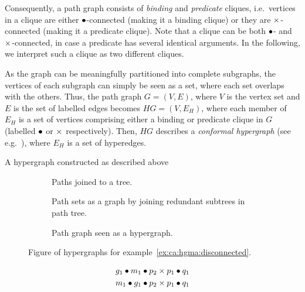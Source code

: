 \documentclass[../Master.tex]{subfiles}
\begin{document}
Consequently, a path graph consists of \textit{binding} and \textit{predicate} cliques, i.e.\ vertices in a clique are either $\bullet$-connected (making it a binding clique) or they are $\times$-connected (making it a predicate clique). Note that a clique can be both $\bullet$- and $\times$-connected, in case a predicate has several identical arguments. In the following, we interpret such a clique as two different cliques.

As the graph can be meaningfully partitioned into complete subgraphs, the vertices of each subgraph can simply be seen as a set, where each set overlaps with the others. Thus, the path graph $G = (V, E)$, where $V$ is the vertex set and $E$ is the set of labelled edges becomes $HG = \left(V, E_H\right)$, where each member of $E_H$ is a set of vertices comprising either a binding or predicate clique in $G$ (labelled $\bullet$ or $\times$ respectively). Then, $HG$ describes a \emph{conformal hypergraph} (see e.g.\ \cite{bretto}), where $E_H$ is a set of hyperedges.

A hypergraph constructed as described above 

\begin{figure}
    \centering
    \begin{subfigure}[t]{0.30\textwidth}
        \centering
        \raisebox{-0.5\height}{\resizebox{\linewidth}{!}{}}
        \caption{Paths joined to a tree.}
        \label{fig:ca:graphExTree}
    \end{subfigure}%
    \hfill%
    \begin{subfigure}[t]{0.30\textwidth}
        \centering
        \resizebox{1\linewidth}{!}{\raisebox{-0.5\height}{}}
        \caption{Path sets as a graph by joining redundant subtrees in path tree.}
        \label{fig:ca:graphExGraph}
    \end{subfigure}
    \hfill%
    \begin{subfigure}[t]{0.30\textwidth}
        \centering
        \resizebox{1\linewidth}{!}{\raisebox{-0.5\height}{}}
        \caption{Path graph seen as a hypergraph.}
        \label{fig:ca:graphExHG}
    \end{subfigure}
    \caption{Figure of hypergraphs for example~\ref{ex:ca:hgma:disconnected}.}\label{fig:ex:ca:hgma:ex:disconnected}
\end{figure}

\begin{example}
    \begin{align*}
        & g_1 \bullet m_1 \bullet p_2 \times p_1 \bullet q_1 \\
        & m_1 \bullet g_1 \bullet p_2 \times p_1 \bullet q_1
    \end{align*}
\end{example}
\end{document}
